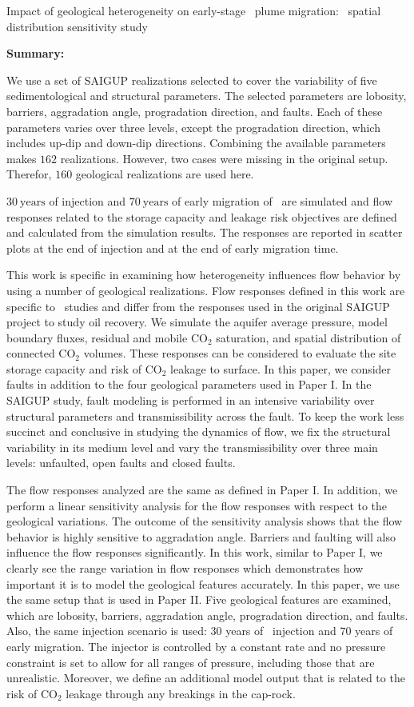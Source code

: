 {Impact of geological heterogeneity on early-stage \coo\ plume migration: \coo\
spatial distribution sensitivity study}
{
\textbf{Summary:}

We use a set of SAIGUP realizations selected to cover the variability of five
sedimentological and structural parameters. The selected parameters are
lobosity, barriers, aggradation angle, progradation direction, and faults. Each
of these parameters varies over three levels, except the progradation direction,
which includes up-dip and down-dip directions. Combining the available 
parameters makes $162$ realizations. However, two cases were missing in the original setup. Therefor, $160$ geological realizations are used here.

$30~\mbox{years}$ of injection and $70~\mbox{years}$ of early migration of \coo\ are simulated and flow responses related to the storage
capacity and leakage risk objectives are defined and calculated from
the simulation results. The responses are reported in scatter plots at the end of
injection and at the end of early migration time. 

This work is specific in examining how heterogeneity influences flow behavior
by using a number of geological realizations. Flow responses defined in
this work are specific to \coo\ studies and differ from the responses
used in the original SAIGUP project to study oil recovery. We simulate the
aquifer average pressure,  model boundary fluxes, residual and mobile CO$_2$
saturation, and spatial distribution of connected CO$_2$ volumes. These
responses can be considered to evaluate the site storage capacity and risk of
CO$_2$ leakage to surface. 
In this paper, we consider faults in addition to the four geological parameters
used in Paper I. In the SAIGUP study, fault modeling is performed in an
intensive variability over structural parameters and transmissibility across the
fault. To keep the work less succinct and conclusive in studying the
dynamics of flow, we fix the structural variability in its medium level and vary
the transmissibility over three main levels: unfaulted, open faults and closed
faults.

The flow responses analyzed are the same as
  defined in Paper I. In addition, we perform a linear sensitivity analysis for
the flow responses
with respect to the geological variations. The outcome of the sensitivity analysis
shows that the flow behavior is highly sensitive to aggradation angle. Barriers
and faulting will also influence the flow responses significantly. In this
work, similar to Paper I, we clearly see the range variation in
flow responses which demonstrates how important it is to model the geological
features accurately. 
In this paper, we use the same setup that is used in Paper II. Five
geological features are examined, which are lobosity, barriers, aggradation
angle, progradation direction, and faults. Also, the same injection scenario is
used: $30$ years of \coo\ injection and $70$ years of early migration.
The injector is controlled by a constant rate and no pressure constraint is set
to allow for all ranges of pressure, including those that are unrealistic.
Moreover, we define an additional model output that is related to the risk of
CO$_2$ leakage through any breakings in the cap-rock.

}

